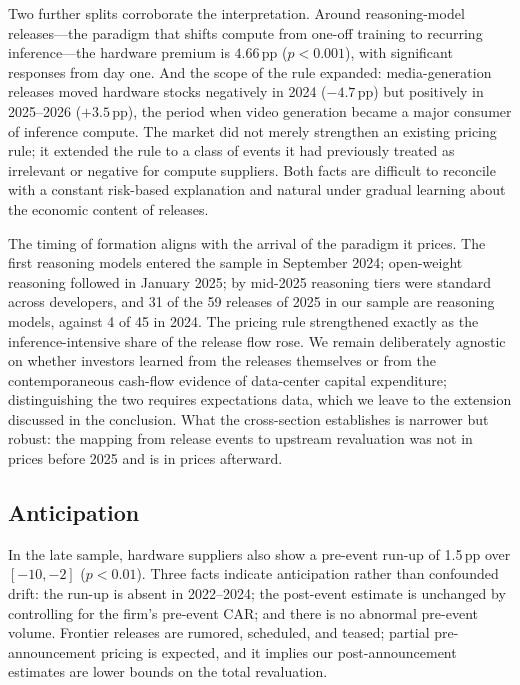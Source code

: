 \documentclass[review,12pt,authoryear]{elsarticle}
\newcommand{\pp}{\,pp}
\begin{document}
Two further splits corroborate the interpretation. Around reasoning-model
releases---the paradigm that shifts compute from one-off training to
recurring inference---the hardware premium is $4.66$\pp{} ($p<0.001$), with
significant responses from day one. And the scope of the rule expanded:
media-generation releases moved hardware stocks negatively in 2024
($-4.7$\pp{}) but positively in 2025--2026 ($+3.5$\pp{}), the period when
video generation became a major consumer of inference compute. The market did
not merely strengthen an existing pricing rule; it extended the rule to a
class of events it had previously treated as irrelevant or negative for
compute suppliers. Both facts are difficult to reconcile with a constant
risk-based explanation and natural under gradual learning about the economic
content of releases.

The timing of formation aligns with the arrival of the paradigm it prices.
The first reasoning models entered the sample in September 2024; open-weight
reasoning followed in January 2025; by mid-2025 reasoning tiers were standard
across developers, and 31 of the 59 releases of 2025 in our sample are
reasoning models, against 4 of 45 in 2024. The pricing rule strengthened
exactly as the inference-intensive share of the release flow rose. We remain
deliberately agnostic on whether investors learned from the releases
themselves or from the contemporaneous cash-flow evidence of data-center
capital expenditure; distinguishing the two requires expectations data, which
we leave to the extension discussed in the conclusion. What the cross-section
establishes is narrower but robust: the mapping from release events to
upstream revaluation was not in prices before 2025 and is in prices
afterward.

\subsection{Anticipation}

In the late sample, hardware suppliers also show a pre-event run-up of
1.5\pp{} over $[-10,-2]$ ($p<0.01$). Three facts indicate anticipation rather
than confounded drift: the run-up is absent in 2022--2024; the post-event
estimate is unchanged by controlling for the firm's pre-event CAR; and there
is no abnormal pre-event volume. Frontier releases are rumored, scheduled,
and teased; partial pre-announcement pricing is expected, and it implies our
post-announcement estimates are lower bounds on the total revaluation.

\end{document}
